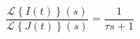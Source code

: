 \documentclass{article}
\newcommand{\Laplace}[1]{\mathcal{L}\left\{#1\right\}(s)}
\begin{document}
\begin{equation}
\frac{\Laplace{I(t)}}{\Laplace{J(t)}} = \frac{1}{\tau s + 1}
\label{eq:currentloop}
\end{equation}
\end{document}
